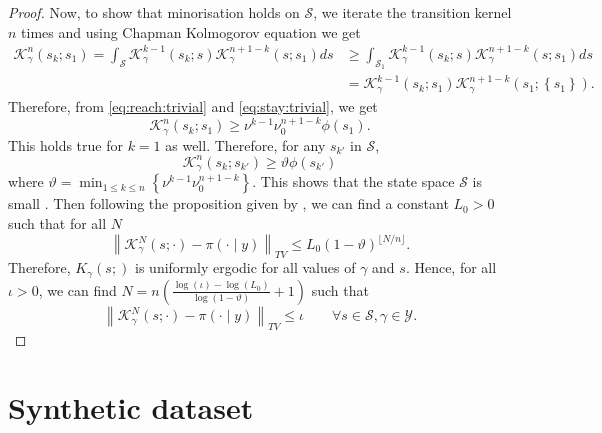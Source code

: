 \documentclass[
12pt]{article}
\begin{document}
\begin{proof}
	Now, to show that minorisation holds on $\mathcal{S}$, we iterate the transition kernel $n$ times and using Chapman Kolmogorov equation we get
	\begin{align*}
		\mathcal{K}_{\gamma}^n\left(s_k;s_1\right)
		= \int_{\mathcal{S}}\mathcal{K}_{\gamma}^{k-1}\left(s_k;s\right)\mathcal{K}_{\gamma}^{n+1-k}\left(s;s_1\right)ds
		& \ge \int_{\mathcal{S}_1}\mathcal{K}_{\gamma}^{k-1}\left(s_k;s\right)\mathcal{K}_{\gamma}^{n+1-k}\left(s;s_1\right)ds\\
		& = \mathcal{K}_{\gamma}^{k-1}\left(s_k;s_1\right)\mathcal{K}_{\gamma}^{n+1-k}\left(s_1;\left\{s_1\right\}\right).
	\end{align*}
	Therefore, from \cref{eq:reach:trivial} and \cref{eq:stay:trivial}, we get 
	\begin{equation*}
		\mathcal{K}_{\gamma}^n\left(s_k;s_1\right) \ge \nu^{k-1} \nu_0^{n+1-k}\phi\left(s_1\right).
	\end{equation*}
	This holds true for $k=1$ as well. Therefore, for any $s_{k'}$ in $\mathcal{S}$,  
	\begin{equation*}
		\mathcal{K}_{\gamma}^n\left(s_k;s_{k'}\right) \ge \vartheta\phi\left(s_{k'}\right)
	\end{equation*}
	where $\vartheta = \min_{1\le k\le n}\left\{\nu^{k-1} \nu_0^{n+1-k}\right\}$. This shows that the state space $\mathcal{S}$ is small \citep{meyn_tweedie1994}. Then following the proposition given by \citet{Tierney1994}, we can find a constant $L_0>0$ such that for all $N$
	\begin{equation}
		\left\|\mathcal{K}^N_{\gamma}(s;\cdot) - \pi(\cdot\mid y)\right\|_{TV} \le L_0 (1-\vartheta)^{\lfloor N/n\rfloor}.
	\end{equation}
	Therefore, $K_{\gamma}(s;)$ is uniformly ergodic for all values of $\gamma$ and $s$. Hence, for all $\iota>0$, we can find $N = n\left(\frac{\log(\iota)-\log(L_0)}{\log(1-\vartheta)} +1\right)$ such that
	\begin{equation}
		\left\|\mathcal{K}^N_{\gamma}(s;\cdot) - \pi(\cdot\mid y)\right\|_{TV} \le \iota \qquad\forall s\in \mathcal{S}, \gamma\in\mathcal{Y}.
	\end{equation}
	
\end{proof}

\section{Synthetic dataset}\label{app:results}
\end{document}
